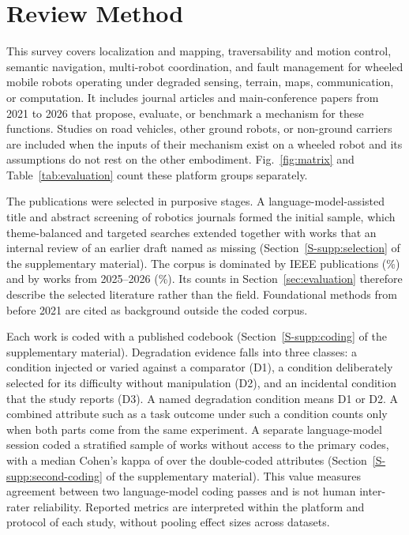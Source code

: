 \section{Review Method}
\label{sec:methodology}

This survey covers localization and mapping, traversability and motion control, semantic navigation, multi-robot coordination, and fault management for wheeled mobile robots operating under degraded sensing, terrain, maps, communication, or computation. It includes journal articles and main-conference papers from 2021 to 2026 that propose, evaluate, or benchmark a mechanism for these functions. Studies on road vehicles, other ground robots, or non-ground carriers are included when the inputs of their mechanism exist on a wheeled robot and its assumptions do not rest on the other embodiment. Fig.~\ref{fig:matrix} and Table~\ref{tab:evaluation} count these platform groups separately.

The \CorpusCount{} publications were selected in purposive stages. A language-model-assisted title and abstract screening of robotics journals formed the initial sample, which theme-balanced and targeted searches extended together with works that an internal review of an earlier draft named as missing (Section~\ref{S-supp:selection} of the supplementary material). The corpus is dominated by IEEE publications (\IEEEShare\%) and by works from 2025--2026 (\RecentShare\%). Its counts in Section~\ref{sec:evaluation} therefore describe the selected literature rather than the field. Foundational methods from before 2021 are cited as background outside the coded corpus.

Each work is coded with a published codebook (Section~\ref{S-supp:coding} of the supplementary material). Degradation evidence falls into three classes: a condition injected or varied against a comparator (D1), a condition deliberately selected for its difficulty without manipulation (D2), and an incidental condition that the study reports (D3). A named degradation condition means D1 or D2. A combined attribute such as a task outcome under such a condition counts only when both parts come from the same experiment. A separate language-model session coded a stratified sample of \SampleCount{} works without access to the primary codes, with a median Cohen's kappa of \KappaMedian{} over the double-coded attributes (Section~\ref{S-supp:second-coding} of the supplementary material). This value measures agreement between two language-model coding passes and is not human inter-rater reliability. Reported metrics are interpreted within the platform and protocol of each study, without pooling effect sizes across datasets.

